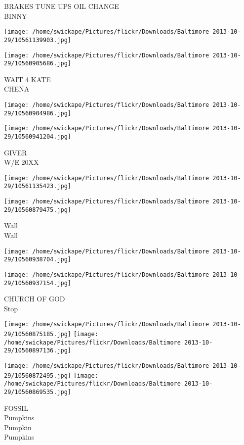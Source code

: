 \documentclass[10pt,letterpaper]{article}
\begin{document}
BRAKES TUNE UPS OIL CHANGE\\
BINNY
\pagebreak

\texttt{[image: /home/swickape/Pictures/flickr/Downloads/Baltimore 2013-10-29/10561139903.jpg]}

\vspace{0.25in}
\texttt{[image: /home/swickape/Pictures/flickr/Downloads/Baltimore 2013-10-29/10560905686.jpg]}

WAIT 4 KATE\\
CHENA
\pagebreak

\texttt{[image: /home/swickape/Pictures/flickr/Downloads/Baltimore 2013-10-29/10560904986.jpg]}

\vspace{0.25in}
\texttt{[image: /home/swickape/Pictures/flickr/Downloads/Baltimore 2013-10-29/10560941204.jpg]}

GIVER\\
W/E 20XX
\pagebreak

\texttt{[image: /home/swickape/Pictures/flickr/Downloads/Baltimore 2013-10-29/10561135423.jpg]}

\vspace{0.25in}
\texttt{[image: /home/swickape/Pictures/flickr/Downloads/Baltimore 2013-10-29/10560879475.jpg]}

Wall\\
Wall
\pagebreak

\texttt{[image: /home/swickape/Pictures/flickr/Downloads/Baltimore 2013-10-29/10560938704.jpg]}

\vspace{0.25in}
\texttt{[image: /home/swickape/Pictures/flickr/Downloads/Baltimore 2013-10-29/10560937154.jpg]}

CHURCH OF GOD\\
Stop
\pagebreak

\texttt{[image: /home/swickape/Pictures/flickr/Downloads/Baltimore 2013-10-29/10560875185.jpg]}
\texttt{[image: /home/swickape/Pictures/flickr/Downloads/Baltimore 2013-10-29/10560897136.jpg]}

\texttt{[image: /home/swickape/Pictures/flickr/Downloads/Baltimore 2013-10-29/10560872495.jpg]}
\texttt{[image: /home/swickape/Pictures/flickr/Downloads/Baltimore 2013-10-29/10560869535.jpg]}

FOSSIL\\
Pumpkins\\
Pumpkin\\
Pumpkins
\pagebreak
\end{document}
